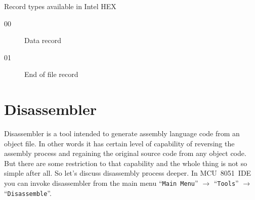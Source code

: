 \documentclass[a4paper,twoside,12pt]{book}
\newcommand{\menuitem}[1]{\texttt{#1}}
\begin{document}
		Record types available in Intel HEX
		\begin{description}
			\item[00] Data record
			\item[01] End of file record
 		\end{description}

\chapter{Disassembler}
	Disassembler is a tool intended to generate assembly language code from an object file. In other words it has certain level of capability of reversing the assembly process and regaining the original source code from any object code. But there are some restriction to that capability and the whole thing is not so simple after all. So let's discuss disassembly process deeper. In MCU~8051~IDE you can invoke disassembler from the main menu  ``\menuitem{Main Menu}'' $\rightarrow$  ``\menuitem{Tools}'' $\rightarrow$  ``\menuitem{Disassemble}''.
\end{document}

